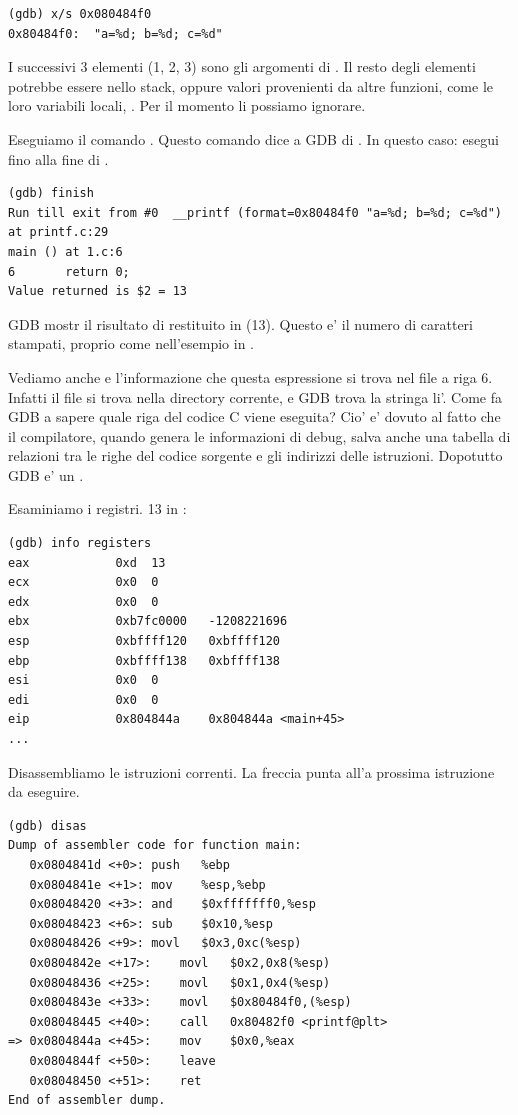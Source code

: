 \begin{lstlisting}
(gdb) x/s 0x080484f0
0x80484f0:	"a=%d; b=%d; c=%d"
\end{lstlisting}

I successivi 3 elementi (1, 2, 3) sono gli argomenti di \printf.
Il resto degli elementi potrebbe essere  nello stack, oppure valori provenienti da altre funzioni, come le loro variabili locali,  \etc{}.
Per il momento li possiamo ignorare.

Eseguiamo il comando . 
Questo comando dice a GDB di .
In questo caso: esegui fino alla fine di \printf.

\begin{lstlisting}
(gdb) finish
Run till exit from #0  __printf (format=0x80484f0 "a=%d; b=%d; c=%d") at printf.c:29
main () at 1.c:6
6		return 0;
Value returned is $2 = 13
\end{lstlisting}

\ac{GDB} mostr il risultato di \printf restituito in \EAX (13).
Questo e' il numero di caratteri stampati, proprio come nell'esempio in \olly.

Vediamo anche  e l'informazione che questa espressione si trova nel file  a riga 6.
Infatti il file  si trova nella directory corrente, e \ac{GDB} trova la stringa li'.
Come fa \ac{GDB} a sapere quale riga del codice C viene eseguita?
Cio' e' dovuto al fatto che il compilatore, quando genera le informazioni di debug, salva anche una tabella di relazioni tra le righe del
codice sorgente e gli indirizzi delle istruzioni.
Dopotutto GDB e' un .

Esaminiamo i registri.
13 in \EAX:

\begin{lstlisting}
(gdb) info registers
eax            0xd	13
ecx            0x0	0
edx            0x0	0
ebx            0xb7fc0000	-1208221696
esp            0xbffff120	0xbffff120
ebp            0xbffff138	0xbffff138
esi            0x0	0
edi            0x0	0
eip            0x804844a	0x804844a <main+45>
...
\end{lstlisting}

Disassembliamo le istruzioni correnti.
La freccia punta all'a prossima istruzione da eseguire.

\begin{lstlisting}
(gdb) disas
Dump of assembler code for function main:
   0x0804841d <+0>:	push   %ebp
   0x0804841e <+1>:	mov    %esp,%ebp
   0x08048420 <+3>:	and    $0xfffffff0,%esp
   0x08048423 <+6>:	sub    $0x10,%esp
   0x08048426 <+9>:	movl   $0x3,0xc(%esp)
   0x0804842e <+17>:	movl   $0x2,0x8(%esp)
   0x08048436 <+25>:	movl   $0x1,0x4(%esp)
   0x0804843e <+33>:	movl   $0x80484f0,(%esp)
   0x08048445 <+40>:	call   0x80482f0 <printf@plt>
=> 0x0804844a <+45>:	mov    $0x0,%eax
   0x0804844f <+50>:	leave  
   0x08048450 <+51>:	ret    
End of assembler dump.
\end{lstlisting}

